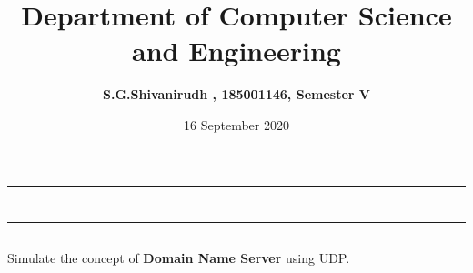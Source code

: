\documentclass[12pt,letterpaper]{article}
\title{\textbf{Department of Computer Science and Engineering}}
\author{\textbf{S.G.Shivanirudh , 185001146, Semester V }}
\date{16 September 2020}
\begin{document}
\maketitle
\hrule
\section*{}
\hrule 
\bigskip\bigskip

\subsection*{}

\subsection*{}
\begin{flushleft}
Simulate the concept of \textbf{Domain Name Server} using UDP.
\end{flushleft}

\subsection*{}
\subsubsection*{}
\begin{flushleft}

\end{flushleft}
\subsubsection*{}
\begin{flushleft}

\end{flushleft}
\subsubsection*{}
\begin{flushleft}

\end{flushleft}

\subsection*{}
\end{document}
